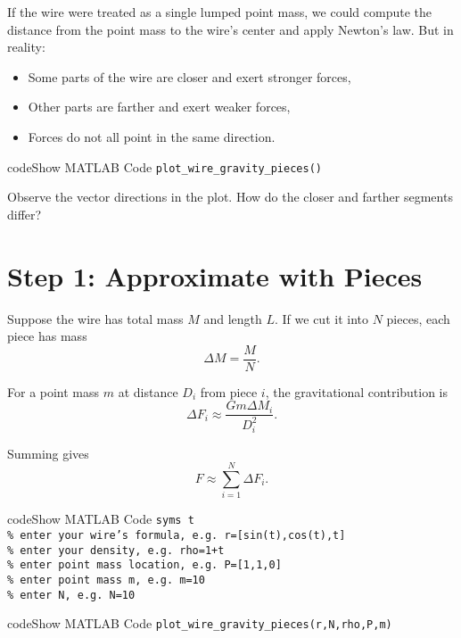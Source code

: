 \documentclass{ximera}
\begin{document}
If the wire were treated as a single lumped point mass, we could compute the distance from the point mass to the wire's center and apply Newton's law.  
But in reality:
\begin{itemize}
\item Some parts of the wire are closer and exert stronger forces,
\item Other parts are farther and exert weaker forces,
\item Forces do not all point in the same direction.
\end{itemize}

\begin{expandable}{code}{Show MATLAB Code}
\texttt{plot\_wire\_gravity\_pieces()}
\end{expandable}

\begin{problem}
Observe the vector directions in the plot. How do the closer and farther segments differ? 
\end{problem}

\section*{Step 1: Approximate with Pieces}

Suppose the wire has total mass $M$ and length $L$. If we cut it into $N$ pieces, each piece has mass
\[
\Delta M = \frac{M}{N}.
\]

For a point mass $m$ at distance $D_i$ from piece $i$, the gravitational contribution is
\[
\Delta F_i \approx \frac{G m \Delta M_i}{D_i^2}.
\]

Summing gives
\[
F \approx \sum_{i=1}^N \Delta F_i.
\]

\begin{expandable}{code}{Show MATLAB Code}
\texttt{syms t}\\
\texttt{\% enter your wire's formula, e.g. r=[sin(t),cos(t),t]}\\
\texttt{\% enter your density, e.g. rho=1+t}\\
\texttt{\% enter point mass location, e.g. P=[1,1,0]}\\
\texttt{\% enter point mass m, e.g. m=10}\\
\texttt{\% enter N, e.g. N=10}
\end{expandable}

\begin{expandable}{code}{Show MATLAB Code}
\texttt{plot\_wire\_gravity\_pieces(r,N,rho,P,m)}
\end{expandable}
\end{document}
